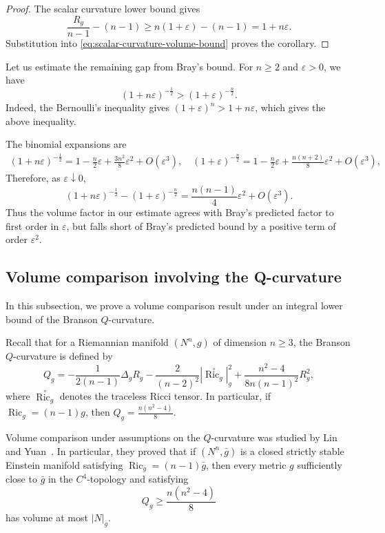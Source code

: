 \documentclass[11pt, reqno]{amsart}
\begin{document}
\begin{proof}
The scalar curvature lower bound gives
$$
\frac{R_g}{n-1}-(n-1)
\ge n(1+\varepsilon)-(n-1)
=1+n\varepsilon.
$$
Substitution into \eqref{eq:scalar-curvature-volume-bound} proves the
corollary.
\end{proof}

Let us estimate the remaining gap from Bray's bound.
For $n\ge 2$ and $\varepsilon>0$, we have
\begin{equation*}\label{eq:strict-gap}
(1+n\varepsilon)^{-\frac{1}{2}}>(1+\varepsilon)^{-\frac{n}{2}}.
\end{equation*}
Indeed, the Bernoulli's inequality gives $(1+\varepsilon)^n>1+n\varepsilon$, which gives the above inequality.

The binomial expansions are
\begin{align*}
(1+n\varepsilon)^{-\frac{1}{2}}
=1-\frac n2\varepsilon+\frac{3n^2}{8}\varepsilon^2 +O(\varepsilon^3), \quad
(1+\varepsilon)^{-\frac{n}{2}}
=1-\frac n2\varepsilon+\frac{n(n+2)}{8}\varepsilon^2 +O(\varepsilon^3),
\end{align*}
Therefore, as $\varepsilon \downarrow 0$,
$$
(1+n \varepsilon)^{-\frac{1}{2}}-(1+\varepsilon)^{-\frac{n}{2}}=\frac{n(n-1)}{4} \varepsilon^2+O\left(\varepsilon^3\right).
$$
Thus the volume factor in our estimate agrees with Bray's predicted factor to first order in $\varepsilon$, but falls short of Bray's predicted bound by a positive term of order $\varepsilon^2$.

\subsection{Volume comparison involving the Q-curvature}
In this subsection, we prove a volume comparison result under an integral lower bound of the Branson $Q$-curvature.

Recall that for a Riemannian manifold $(N^n, g)$ of dimension $n\ge 3$, the Branson $Q$-curvature \cite{Branson1985} is defined by
\begin{equation}\label{eq:Q-curvature}
Q_g=-\frac{1}{2(n-1)}\Delta_gR_g-\frac{2}{(n-2)^2}|\stackrel {\circ}{\operatorname{Ric}_g}|_g^2+\frac{n^2-4}{8n(n-1)^2}R_g^2,
\end{equation}
where $\stackrel {\circ}{\operatorname{Ric}_g}$ denotes the traceless Ricci tensor. In particular, if $\operatorname{Ric}_g=(n-1)g$, then
$Q_g=\frac{n(n^2-4)}8$.

Volume comparison under assumptions on the $Q$-curvature was studied by Lin and Yuan~\cite{LinYuan2}. In particular, they proved that if $(N^n, \bar g)$ is a closed strictly stable Einstein manifold satisfying $\operatorname{Ric}_{\bar g}=(n-1)\bar g$, then every metric $g$ sufficiently close to $\bar g$ in the $C^4$-topology and satisfying
$$Q_g\ge \frac{n(n^2-4)}{8}$$
has volume at most $|N|_{\bar g}$.
\end{document}

